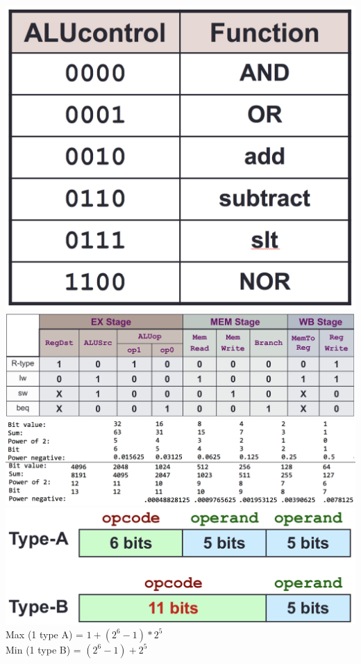 \documentclass[a4paper]{article} \usepackage[backend=biber, style=numeric, sorting=none]{biblatex}
\begin{document}
\begin{multicols*}{4}
\begin{center}
{\centering \includegraphics[scale=0.13]{ALUControl}}
\\ {\centering \includegraphics[angle=90,origin=c,scale=0.25]{InstructionControl}}
{\centering \includegraphics[angle=90,origin=c,scale=0.34]{powersOfTwo}}
\vspace{5mm} %
\\ {\centering \includegraphics[scale=0.25]{expandingOpcode} }
\\ Max (1 type A) = $1 + (2^6 - 1) * 2^5$
\\ Min (1 type B) = $(2^6 - 1) + 2^5$


\end{center}
\end{multicols*}
\end{document}
